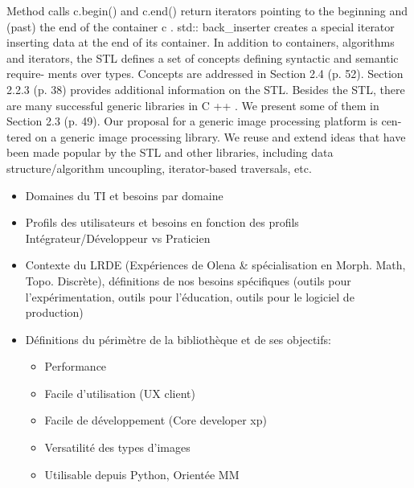 Method calls c.begin() and c.end() return iterators pointing
to the beginning and (past) the end of the container c . std::
back\_inserter creates a special iterator inserting data at the end
of its container.
In addition to containers, algorithms and iterators, the STL
defines a set of concepts defining syntactic and semantic require-
ments over types. Concepts are addressed in Section 2.4 (p. 52).
Section 2.2.3 (p. 38) provides additional information on the STL.
Besides the STL, there are many successful generic libraries in
C ++ . We present some of them in Section 2.3 (p. 49).
Our proposal for a generic image processing platform is cen-
tered on a generic image processing library. We reuse and extend
ideas that have been made popular by the STL and other libraries,
including data structure/algorithm uncoupling, iterator-based
traversals, etc.

\begin{itemize}
  \item Domaines du TI et besoins par domaine
  \item Profils des utilisateurs et besoins en fonction des profils Intégrateur/Développeur vs Praticien
  \item Contexte du LRDE (Expériences de Olena \& spécialisation en Morph. Math, Topo. Discrète), définitions de nos
        besoins spécifiques (outils pour l'expérimentation, outils pour l'éducation, outils pour le logiciel de production)
  \item Définitions du périmètre de la bibliothèque et de ses objectifs:
        \begin{itemize}
          \item Performance
          \item Facile d'utilisation (UX client)
          \item Facile de développement (Core developer xp)
          \item Versatilité des types d'images
          \item Utilisable depuis Python, Orientée MM
        \end{itemize}
\end{itemize}